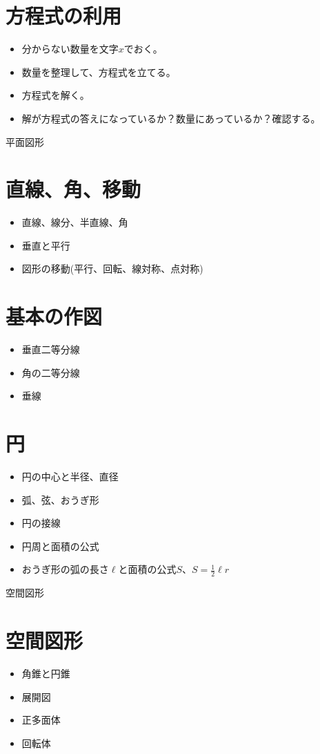 \documentclass{jsarticle}
\begin{document}
\section{方程式の利用}
\begin{itemize}
\item 分からない数量を文字$x$でおく。
\item 数量を整理して、方程式を立てる。
\item 方程式を解く。
\item 解が方程式の答えになっているか？数量にあっているか？確認する。
\end{itemize}

\newpage

{\LARGE \noindent 平面図形}

\section{直線、角、移動}
\begin{itemize}
\item 直線、線分、半直線、角
\item 垂直と平行
\item 図形の移動(平行、回転、線対称、点対称)
\end{itemize}

\section{基本の作図}
\begin{itemize}
\item 垂直二等分線
\item 角の二等分線
\item 垂線
\end{itemize}

\section{円}
\begin{itemize}
\item 円の中心と半径、直径
\item 弧、弦、おうぎ形
\item 円の接線
\item 円周と面積の公式
\item おうぎ形の弧の長さ$\ell$と面積の公式$S$、$S=\frac{1}{2} \ell r$
\end{itemize}

\newpage

{\LARGE \noindent 空間図形}
\section{空間図形}
\begin{itemize}
\item 角錐と円錐
\item 展開図
\item 正多面体
\item 回転体
\end{itemize}
\end{document}

